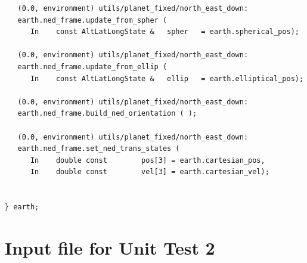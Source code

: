 \documentclass[twoside,11pt,titlepage]{report}
\begin{document}
\begin{verbatim}
   (0.0, environment) utils/planet_fixed/north_east_down:
   earth.ned_frame.update_from_spher (
      In    const AltLatLongState &   spher   = earth.spherical_pos);

   (0.0, environment) utils/planet_fixed/north_east_down:
   earth.ned_frame.update_from_ellip (
      In    const AltLatLongState &   ellip   = earth.elliptical_pos);

   (0.0, environment) utils/planet_fixed/north_east_down:
   earth.ned_frame.build_ned_orientation ( );

   (0.0, environment) utils/planet_fixed/north_east_down:
   earth.ned_frame.set_ned_trans_states (
      In    double const        pos[3] = earth.cartesian_pos,
      In    double const        vel[3] = earth.cartesian_vel);


} earth;

\end{verbatim}

\chapter{Input file for Unit Test 2}\label{ap4:in2}
\end{document}
